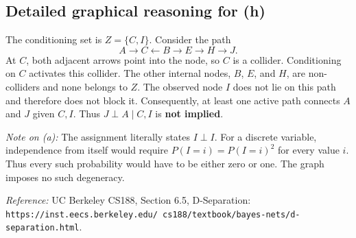 \subsection*{Detailed graphical reasoning for (h)}
The conditioning set is $Z=\{C,I\}$. Consider the path
\[
 A\longrightarrow C\longleftarrow B\longrightarrow E
 \longrightarrow H\longrightarrow J.
\]
At $C$, both adjacent arrows point into the node, so $C$ is a collider.
Conditioning on $C$ activates this collider. The other internal nodes,
$B$, $E$, and $H$, are non-colliders and none belongs to $Z$.
The observed node $I$ does not lie on this path and therefore does not block it.
Consequently, at least one active path connects $A$ and $J$ given $C,I$.
Thus $J\perp A\mid C,I$ is \textbf{not implied}.

\medskip
\noindent\textit{Note on (a):} The assignment literally states $I\perp I$.
For a discrete variable, independence from itself would require
$P(I=i)=P(I=i)^2$ for every value $i$. Thus every such probability would
have to be either zero or one. The graph imposes no such degeneracy.

\medskip
\noindent\textit{Reference:} UC Berkeley CS188, Section 6.5, D-Separation:
\texttt{https://inst.eecs.berkeley.edu/\string~cs188/textbook/bayes-nets/d-separation.html}.

